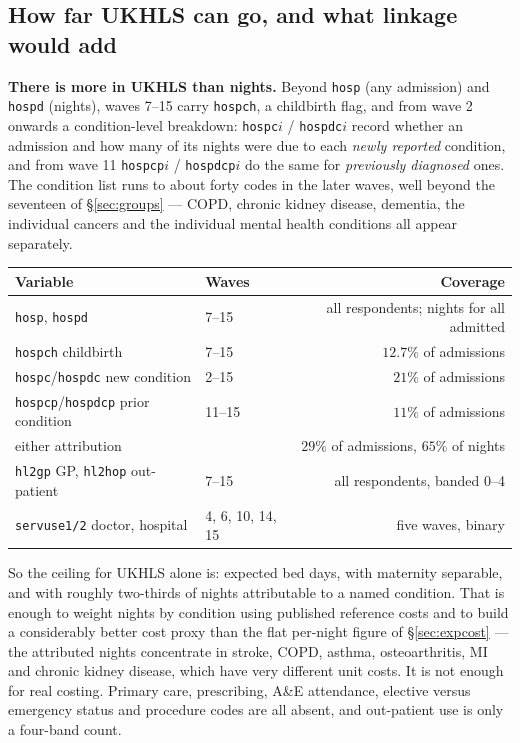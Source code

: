 \documentclass[11pt]{article}
\newcommand{\code}[1]{\texttt{\small #1}}
\begin{document}
\subsection{How far UKHLS can go, and what linkage would add}
\label{sec:utilceiling}

\textbf{There is more in UKHLS than nights.} Beyond \code{hosp} (any
admission) and \code{hospd} (nights), waves 7--15 carry \code{hospch}, a
childbirth flag, and from wave 2 onwards a condition-level breakdown:
\code{hospc}$i$ / \code{hospdc}$i$ record whether an admission and how many
of its nights were due to each \emph{newly reported} condition, and from wave
11 \code{hospcp}$i$ / \code{hospdcp}$i$ do the same for \emph{previously
diagnosed} ones. The condition list runs to about forty codes in the later
waves, well beyond the seventeen of \S\ref{sec:groups} --- COPD, chronic
kidney disease, dementia, the individual cancers and the individual mental
health conditions all appear separately.

\begin{center}\small
\begin{tabular}{llr}
\toprule
Variable & Waves & Coverage \\
\midrule
\code{hosp}, \code{hospd} & 7--15 & all respondents; nights for all admitted \\
\code{hospch} childbirth & 7--15 & $12.7\%$ of admissions \\
\code{hospc}/\code{hospdc} new condition & 2--15 & $21\%$ of admissions \\
\code{hospcp}/\code{hospdcp} prior condition & 11--15 & $11\%$ of admissions \\
\quad either attribution & & $29\%$ of admissions, $65\%$ of nights \\
\code{hl2gp} GP, \code{hl2hop} out-patient & 7--15 & all respondents, banded 0--4 \\
\code{servuse1/2} doctor, hospital & 4, 6, 10, 14, 15 & five waves, binary \\
\bottomrule
\end{tabular}
\end{center}

So the ceiling for UKHLS alone is: expected bed days, with maternity
separable, and with roughly two-thirds of nights attributable to a named
condition. That is enough to weight nights by condition using published
reference costs and to build a considerably better cost proxy than the flat
per-night figure of \S\ref{sec:expcost} --- the attributed nights concentrate
in stroke, COPD, asthma, osteoarthritis, MI and chronic kidney disease, which
have very different unit costs. It is not enough for real costing. Primary
care, prescribing, A\&E attendance, elective versus emergency status and
procedure codes are all absent, and out-patient use is only a four-band
count.
\end{document}
